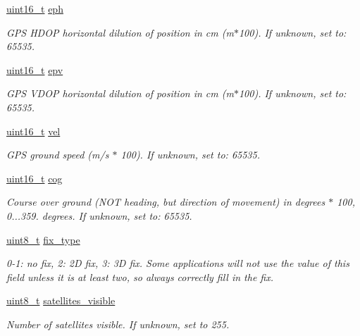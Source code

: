 \begin{DoxyCompactItemize}
\hyperlink{stdint_8h_a273cf69d639a59973b6019625df33e30}{uint16\-\_\-t} \hyperlink{struct____mavlink__gps__raw__int__t_ad7ec0749ffe37d3ada65b701be2cd305}{eph}
\begin{DoxyCompactList}\small\item\em G\-P\-S H\-D\-O\-P horizontal dilution of position in cm (m$\ast$100). If unknown, set to\-: 65535. \end{DoxyCompactList}\item 
\hyperlink{stdint_8h_a273cf69d639a59973b6019625df33e30}{uint16\-\_\-t} \hyperlink{struct____mavlink__gps__raw__int__t_a0d50bc6cc0e56d9f49885e3e550ec944}{epv}
\begin{DoxyCompactList}\small\item\em G\-P\-S V\-D\-O\-P horizontal dilution of position in cm (m$\ast$100). If unknown, set to\-: 65535. \end{DoxyCompactList}\item 
\hyperlink{stdint_8h_a273cf69d639a59973b6019625df33e30}{uint16\-\_\-t} \hyperlink{struct____mavlink__gps__raw__int__t_a77e8cbdbf554637e4fbbdaaabd562eaf}{vel}
\begin{DoxyCompactList}\small\item\em G\-P\-S ground speed (m/s $\ast$ 100). If unknown, set to\-: 65535. \end{DoxyCompactList}\item 
\hyperlink{stdint_8h_a273cf69d639a59973b6019625df33e30}{uint16\-\_\-t} \hyperlink{struct____mavlink__gps__raw__int__t_adbe4dfbea17d1fd08a0841ce29e32637}{cog}
\begin{DoxyCompactList}\small\item\em Course over ground (N\-O\-T heading, but direction of movement) in degrees $\ast$ 100, 0...359. degrees. If unknown, set to\-: 65535. \end{DoxyCompactList}\item 
\hyperlink{stdint_8h_aba7bc1797add20fe3efdf37ced1182c5}{uint8\-\_\-t} \hyperlink{struct____mavlink__gps__raw__int__t_ae014afb6eea2b6033ebde37c79e120f2}{fix\-\_\-type}
\begin{DoxyCompactList}\small\item\em 0-\/1\-: no fix, 2\-: 2\-D fix, 3\-: 3\-D fix. Some applications will not use the value of this field unless it is at least two, so always correctly fill in the fix. \end{DoxyCompactList}\item 
\hyperlink{stdint_8h_aba7bc1797add20fe3efdf37ced1182c5}{uint8\-\_\-t} \hyperlink{struct____mavlink__gps__raw__int__t_af1481a191aa3ffbf832dc3a4c35cbf09}{satellites\-\_\-visible}
\begin{DoxyCompactList}\small\item\em Number of satellites visible. If unknown, set to 255. \end{DoxyCompactList}\end{DoxyCompactItemize}


